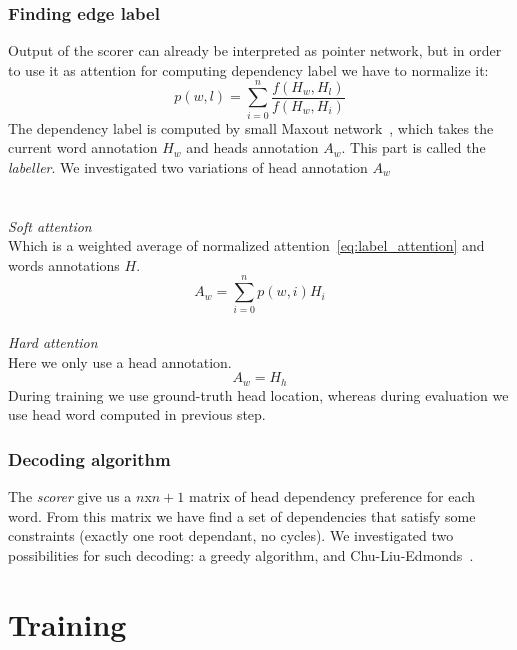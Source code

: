 \subsubsection{Finding edge label}
Output of the scorer can already be interpreted as
pointer network, but in order to use it as attention for computing dependency label
we have to normalize it:
\begin{equation} \label{eq:label_attention}
    p(w,l) = \sum_{i=0}^{n} \frac{f(H_w, H_l)}{f(H_w, H_i)}
\end{equation}
The dependency label is computed by small Maxout network~\cite{goodfellow_maxout_2013},
which takes the current word annotation $H_w$ and heads annotation $A_w$. This
part is called the \emph{labeller}.
We investigated two variations of head annotation $A_w$
\\
\\
\\
\emph{Soft attention}\\
Which is a weighted average of normalized attention~\ref{eq:label_attention}
and words annotations $H$. 
$$ A_w = \sum_{i=0}^{n} p(w,i)H_i $$
\\
\emph{Hard attention}\\
Here we only use a head annotation.
$$ A_w = H_h $$
During training we use ground-truth head location, whereas during evaluation
we use head word computed in previous step.

\subsubsection{Decoding algorithm}
The \emph{scorer} give us a $n$x$n+1$ matrix of head dependency preference
for each word. From this matrix we have find a set of dependencies that satisfy
some constraints (exactly one root dependant, no cycles).
We investigated two possibilities for such decoding: a greedy algorithm, and
Chu-Liu-Edmonds~\cite{edmonds_optimim_1966}.

\section{Training}
